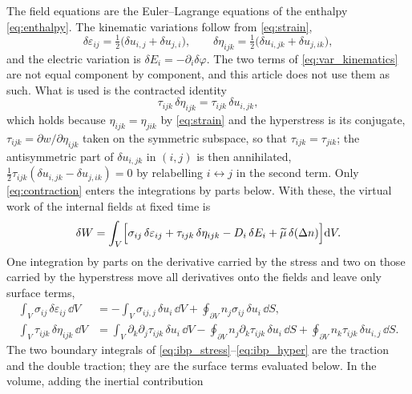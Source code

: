 The field equations are the Euler--Lagrange equations of the enthalpy
\eqref{eq:enthalpy}.  The kinematic variations follow from \eqref{eq:strain},
\begin{equation}
\label{eq:var_kinematics}
\delta\varepsilon_{ij}=\tfrac12\bigl(\delta u_{i,j}+\delta u_{j,i}\bigr),
\qquad
\delta\eta_{ijk}=\tfrac12\bigl(\delta u_{i,jk}+\delta u_{j,ik}\bigr),
\end{equation}
and the electric variation is $\delta E_i=-\partial_i\delta\varphi$.  The two
terms of \eqref{eq:var_kinematics} are not equal component by component, and this
article does not use them as such.  What is used is the contracted identity
\begin{equation}
\label{eq:contraction}
\tau_{ijk}\,\delta\eta_{ijk}=\tau_{ijk}\,\delta u_{i,jk},
\end{equation}
which holds because $\eta_{ijk}=\eta_{jik}$ by \eqref{eq:strain} and the
hyperstress is its conjugate, $\tau_{ijk}=\partial w/\partial\eta_{ijk}$ taken on
the symmetric subspace, so that $\tau_{ijk}=\tau_{jik}$; the antisymmetric part
of $\delta u_{i,jk}$ in $(i,j)$ is then annihilated,
$\tfrac12\tau_{ijk}(\delta u_{i,jk}-\delta u_{j,ik})=0$ by relabelling
$i\leftrightarrow j$ in the second term.  Only \eqref{eq:contraction} enters the
integrations by parts below.  With these, the virtual work of the
internal fields at fixed time is
\begin{equation}
\label{eq:virtual_work}
\delta W=\int_V\Bigl[\sigma_{ij}\,\delta\varepsilon_{ij}
+\tau_{ijk}\,\delta\eta_{ijk}-D_i\,\delta E_i
+\widetilde\mu\,\delta(\Delta n)\Bigr]\mathrm{d} V .
\end{equation}
One integration by parts on the derivative carried by the stress and two on
those carried by the hyperstress move all derivatives onto the fields and
leave only surface terms,
\begin{align}
\int_V\sigma_{ij}\,\delta\varepsilon_{ij}\,\dd V
&=-\int_V\sigma_{ij,j}\,\delta u_i\,\dd V
+\oint_{\partial V}n_j\sigma_{ij}\,\delta u_i\,\dd S ,
\label{eq:ibp_stress}\\[2pt]
\int_V\tau_{ijk}\,\delta\eta_{ijk}\,\dd V
&=\int_V\partial_k\partial_j\tau_{ijk}\,\delta u_i\,\dd V
-\oint_{\partial V}n_j\partial_k\tau_{ijk}\,\delta u_i\,\dd S
+\oint_{\partial V}n_k\tau_{ijk}\,\delta u_{i,j}\,\dd S .
\label{eq:ibp_hyper}
\end{align}
The two boundary integrals of \eqref{eq:ibp_stress}--\eqref{eq:ibp_hyper} are the
traction and the double traction; they are the surface terms evaluated below.  In the volume, adding the inertial contribution

